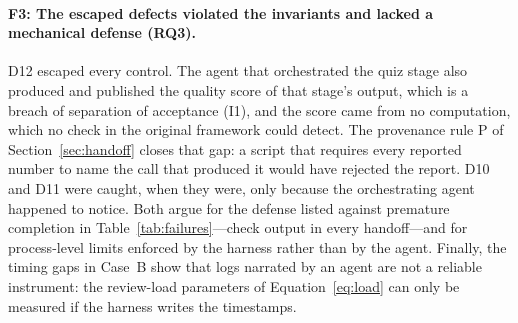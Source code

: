 \paragraph{F3: The escaped defects violated the invariants and lacked a mechanical
defense (RQ3).} D12 escaped every control. The agent that orchestrated the quiz stage
also produced and published the quality score of that stage's output, which is a breach
of separation of acceptance (I1), and the score came from no computation, which no check in the original
framework could detect. The provenance rule P of Section~\ref{sec:handoff} closes that
gap: a script that requires every reported number to name the call that produced it
would have rejected the report. D10 and D11 were caught, when they were, only because the
orchestrating agent happened to notice. Both argue for the defense listed against
premature completion in Table~\ref{tab:failures}---check output in every handoff---and for
process-level limits enforced by the harness rather than by the agent. Finally, the
timing gaps in Case~B show that logs narrated by an agent are not a reliable instrument:
the review-load parameters of Equation~\eqref{eq:load} can only be measured if the harness
writes the timestamps.
